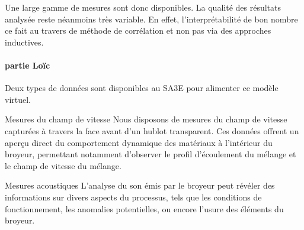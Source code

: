 Une large gamme de mesures sont donc disponibles. La qualité des résultats analysée reste néanmoins très variable. En effet, l'interprétabilité de bon nombre ce fait au travers de méthode de corrélation et non pas via des approches inductives.

\paragraph{partie Loïc}
Deux types de données sont disponibles au SA3E pour alimenter ce modèle virtuel.

Mesures du champ de vitesse
Nous disposons de mesures du champ de vitesse capturées à travers la face avant d'un hublot transparent. Ces données offrent un aperçu direct du comportement dynamique des matériaux à l'intérieur du broyeur, permettant notamment d'observer le profil d'écoulement du mélange et le champ de vitesse du mélange.

Mesures acoustiques
L'analyse du son émis par le broyeur peut révéler des informations sur divers aspects du processus, tels que les conditions de fonctionnement, les anomalies potentielles, ou encore l'usure des éléments du broyeur.